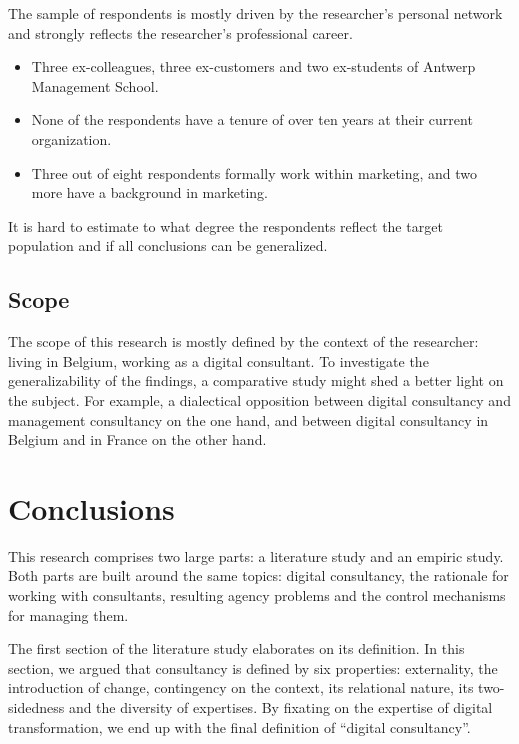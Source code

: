 \documentclass[12pt]{article}
\begin{document}
The sample of respondents is mostly driven by the researcher's personal
network and strongly reflects the researcher's professional career.

\begin{itemize}
\item
  Three ex-colleagues, three ex-customers and two ex-students of Antwerp
  Management School.
\item
  None of the respondents have a tenure of over ten years at their
  current organization.
\item
  Three out of eight respondents formally work within marketing, and two
  more have a background in marketing.
\end{itemize}

It is hard to estimate to what degree the respondents reflect the target
population and if all conclusions can be generalized.

\subsection{Scope}\label{scope-1}

The scope of this research is mostly defined by the context of the
researcher: living in Belgium, working as a digital consultant. To
investigate the generalizability of the findings, a comparative study
might shed a better light on the subject. For example, a dialectical
opposition between digital consultancy and management consultancy on the
one hand, and between digital consultancy in Belgium and in France on
the other hand.

\section{Conclusions}\label{conclusions}

This research comprises two large parts: a literature study and an
empiric study. Both parts are built around the same topics: digital
consultancy, the rationale for working with consultants, resulting
agency problems and the control mechanisms for managing them.

The first section of the literature study elaborates on its definition.
In this section, we argued that consultancy is defined by six
properties: externality, the introduction of change, contingency on the
context, its relational nature, its two-sidedness and the diversity of
expertises. By fixating on the expertise of digital transformation, we
end up with the final definition of ``digital consultancy''.
\end{document}
